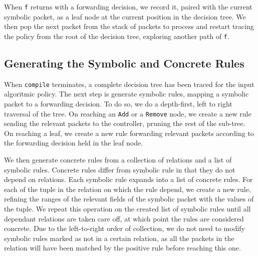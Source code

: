 \documentclass[preprint]{sigplanconf}
\begin{document}



When \lstinline|f| returns with a forwarding decision, we record it, paired with the current symbolic packet, as a leaf node at the current position in the decision tree. We then pop the next packet from the stack of packets to process and restart tracing the policy from the root of the decision tree, exploring another path of \lstinline|f|.  

\subsection*{Generating the Symbolic and Concrete Rules}

When \lstinline|compile| terminates, a complete decision tree has been traced for the input algoritmic policy. The next step is generate symbolic rules, mapping a symbolic packet to a forwarding decision.
To do so, we do a depth-first, left to right traversal of the tree. On reaching an \lstinline|Add| or a \lstinline|Remove| node, we create a new rule sending the relevant packets to the controller, pruning the rest of the sub-tree. On reaching a leaf, we create a new rule forwarding relevant packets according to the forwarding decision held in the leaf node.

We then generate concrete rules from a collection of relations and a list of symbolic rules. Concrete rules differ from symbolic rule in that they do not depend on relations. Each symbolic rule expands into a list of concrete rules. For each of the tuple in the relation on which the rule depend, we create a new rule, refining the ranges of the relevant fields of the symbolic packet with the values of the tuple. We repeat this operation on the created list of symbolic rules until all dependant relations are taken care off, at which point the rules are considered concrete. Due to the left-to-right order of collection, we do not need to modify symbolic rules marked as not in a certain relation, as all the packets in the relation will have been matched by the positive rule before reaching this one.
\end{document}

